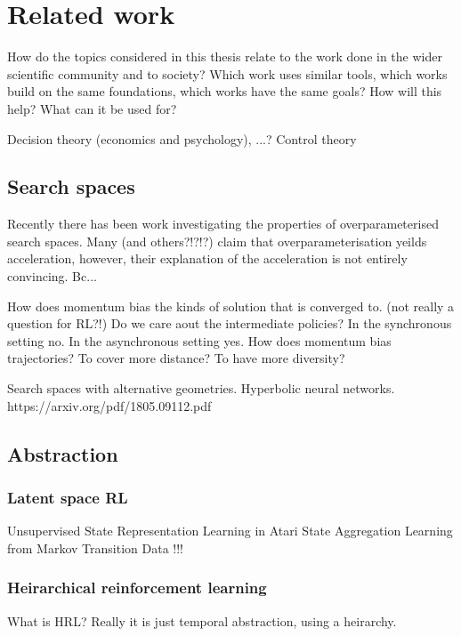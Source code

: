 \chapter{Related work}

How do the topics considered in this thesis relate to the work done in the wider scientific community and to society? Which work uses similar tools, which works build on the same foundations, which works have the same goals? How will this help? What can it be used for?

Decision theory (economics and psychology), ...?
Control theory

\section{Search spaces}

Recently there has been work investigating the properties of overparameterised search spaces.
Many \cite{Arora2018} (and others?!?!?) claim that overparameterisation yeilds acceleration, however,
their explanation of the acceleration is not entirely convincing. Bc...

How does momentum bias the kinds of solution that is converged to. (not really a question for RL?!)
Do we care aout the intermediate policies? In the synchronous setting no. In the asynchronous setting yes.
How does momentum bias trajectories? To cover more distance? To have more diversity?

Search spaces with alternative geometries.
Hyperbolic neural networks. https://arxiv.org/pdf/1805.09112.pdf


\section{Abstraction}

\subsection{Latent space RL}

Unsupervised State Representation Learning in Atari  \cite{Anand2019}
State Aggregation Learning from Markov Transition Data  !!!\cite{Duan2018}


\subsection{Heirarchical reinforcement learning}

What is HRL? Really it is just temporal abstraction, using a heirarchy.


